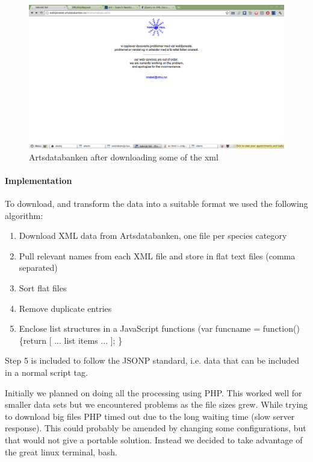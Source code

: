 	\begin{figure}[htb]
	\centering
	\includegraphics[width=1\textwidth]{implementation/preparation/ntnu_server_artsdatabanken.png}
	\caption{Artsdatabanken after downloading some of the xml}
	\label{fig:artsdatabanken_api}
	\end{figure}

	\paragraph{Implementation}
		To download, and transform the data into a suitable format we used the
		following algorithm:

		\begin{enumerate}
			\item Download XML data from Artsdatabanken, one file per species category
			\item Pull relevant names from each XML file and store in flat text files (comma separated)
			\item Sort flat files
			\item Remove duplicate entries
			\item Enclose list structures in a JavaScript functions (var
			funcname = function() \{return [ ... list items ... ]; \}
		\end{enumerate}

		Step 5 is included to follow the JSONP standard, i.e. data
		that can be included in a normal script tag.

		Initially we planned on doing all the processing using PHP. This worked
		well for smaller data sets but we encountered problems as the file
		sizes grew. While trying to download big files PHP timed out due to the
		long waiting time (slow server response). This could probably be
		amended by changing some configurations, but that would not give a
		portable solution. Instead we decided to take advantage of the great
		linux terminal, bash.

